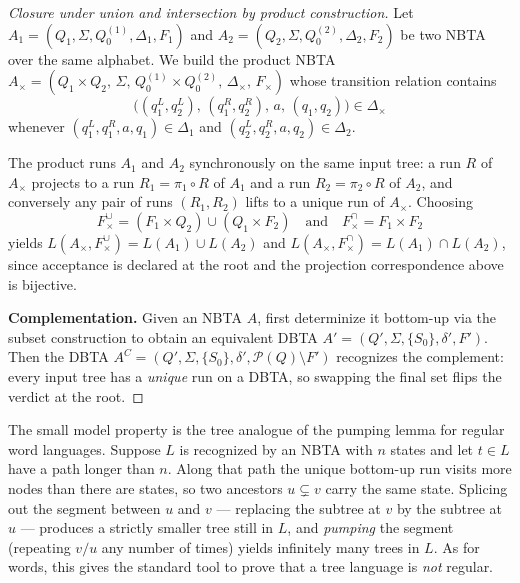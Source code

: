 \begin{proof}[Closure under union and intersection by product construction]
Let $A_1 = (Q_1, \Sigma, Q_0^{(1)}, \Delta_1, F_1)$ and $A_2 = (Q_2, \Sigma, Q_0^{(2)}, \Delta_2, F_2)$ be two NBTA over the same alphabet. We build the product NBTA $A_\times = (Q_1 \times Q_2, \, \Sigma, \, Q_0^{(1)} \times Q_0^{(2)}, \, \Delta_\times, \, F_\times)$ whose transition relation contains
\[
  \bigl((q_1^L, q_2^L), \, (q_1^R, q_2^R), \, a, \, (q_1, q_2)\bigr) \in \Delta_\times
\]
whenever $(q_1^L, q_1^R, a, q_1) \in \Delta_1$ and $(q_2^L, q_2^R, a, q_2) \in \Delta_2$.

The product runs $A_1$ and $A_2$ synchronously on the same input tree: a run $R$ of $A_\times$ projects to a run $R_1 = \pi_1 \circ R$ of $A_1$ and a run $R_2 = \pi_2 \circ R$ of $A_2$, and conversely any pair of runs $(R_1, R_2)$ lifts to a unique run of $A_\times$. Choosing
\[
  F_\times^{\cup} = (F_1 \times Q_2) \cup (Q_1 \times F_2)
  \quad\text{and}\quad
  F_\times^{\cap} = F_1 \times F_2
\]
yields $L(A_\times, F_\times^{\cup}) = L(A_1) \cup L(A_2)$ and $L(A_\times, F_\times^{\cap}) = L(A_1) \cap L(A_2)$, since acceptance is declared at the root and the projection correspondence above is bijective.

\textbf{Complementation.} Given an NBTA $A$, first determinize it bottom-up via the subset construction to obtain an equivalent DBTA $A' = (Q', \Sigma, \{S_0\}, \delta', F')$. Then the DBTA $A^C = (Q', \Sigma, \{S_0\}, \delta', \mathcal{P}(Q) \setminus F')$ recognizes the complement: every input tree has a \emph{unique} run on a DBTA, so swapping the final set flips the verdict at the root.
\end{proof}

\begin{formaldetails}
The small model property is the tree analogue of the pumping lemma for regular word languages. Suppose $L$ is recognized by an NBTA with $n$ states and let $t \in L$ have a path longer than $n$. Along that path the unique bottom-up run visits more nodes than there are states, so two ancestors $u \subsetneq v$ carry the same state. Splicing out the segment between $u$ and $v$ --- replacing the subtree at $v$ by the subtree at $u$ --- produces a strictly smaller tree still in $L$, and \emph{pumping} the segment (repeating $v/u$ any number of times) yields infinitely many trees in $L$. As for words, this gives the standard tool to prove that a tree language is \emph{not} regular.
\end{formaldetails}


